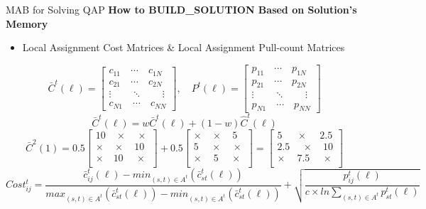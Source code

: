 \documentclass{beamer}
\begin{document}
\begin{frame}[t]{MAB for Solving QAP} %
\textbf{How to BUILD\_SOLUTION Based on Solution's Memory}
\footnotesize
\begin{itemize}
\item Local Assignment Cost Matrices \& Local Assignment Pull-count Matrices
\end{itemize}
\begin{equation}
\bar{C}^{t}(\ell)=
\left[ \begin{array}{ll}
c_{11} \quad \cdots \quad c_{1N}\\
c_{21} \quad \cdots \quad c_{2N}\\
\vdots  \quad \quad \ddots \quad \quad \vdots\\
c_{N1}  \quad \cdots \quad c_{NN}
\end{array} \right], \quad
P^{t}(\ell)=
\left[ \begin{array}{ll}
p_{11} \quad \cdots \quad p_{1N}\\
p_{21} \quad \cdots \quad p_{2N}\\
\vdots  \quad \quad \ddots \quad \quad \vdots\\
p_{N1}  \quad \cdots \quad p_{NN}
\end{array} \right]
\end{equation}
\begin{equation}
\bar{C}^{t}(\ell)=w\bar{C}^{t}(\ell)+(1-w)\hat{C}^{t}(\ell)
\end{equation}
\begin{equation}
\bar{C}^{2}(1)=0.5
\left[ \begin{array}{ll}
10 \quad \times \quad \times\\
\times \quad \times \quad 10\\
\times \quad 10 \quad \ \times\\
\end{array} \right]
+0.5\left[ \begin{array}{ll}
\times \quad \times \quad 5\\
5 \quad \ \times \quad \times\\
\times \quad \ 5 \quad \ \times\\
\end{array} \right]
= \left[ \begin{array}{ll}
5 \quad \ \ \times \quad \ 2.5\\
2.5 \quad \ \times \quad 10\\
\times \quad \ 7.5 \quad \ \times\\
\end{array} \right]
\end{equation}
\begin{equation}
Cost_{ij}^{t}=\frac{\bar{c}_{ij}^{t}(\ell)-min_{(s,t)\in A^t}(\bar{c}_{st}^{t}(\ell))}{max_{(s,t)\in A^t}(\bar{c}_{st}^{t}(\ell))-min_{(s,t)\in A^t}(\bar{c}_{st}^{t}(\ell))}+
\sqrt{\frac{p_{ij}^{t}(\ell)}{c\times ln\sum_{(s,t)\in A^t}p_{st}^{t}(\ell)}}
\end{equation}
\end{frame}
\end{document}
